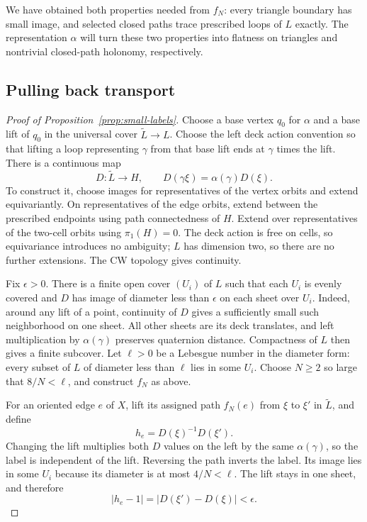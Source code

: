 We have obtained both properties needed from $f_N$: every triangle
boundary has small image, and selected closed paths trace prescribed
loops of $L$ exactly. The representation $\alpha$ will turn these two
properties into flatness on triangles and nontrivial closed-path
holonomy, respectively.

\subsection{Pulling back transport}

\begin{proof}[Proof of Proposition~\ref{prop:small-labels}]
Choose a base vertex $q_0$ for $\alpha$ and a base lift of $q_0$ in
the universal cover $\widetilde L\to L$.  Choose the left deck
action convention so that lifting a loop representing $\gamma$ from
that base lift ends at $\gamma$ times the lift.  There is a
continuous map
\begin{equation}\label{eq:developing-map}
 D:\widetilde L\longrightarrow H,
 \qquad D(\gamma\xi)=\alpha(\gamma)D(\xi).
\end{equation}
To construct it, choose images for representatives of the vertex
orbits and extend equivariantly.  On representatives of the edge
orbits, extend between the prescribed endpoints using path
connectedness of $H$.  Extend over representatives of the two-cell
orbits using $\pi_1(H)=0$.  The deck action is free on cells, so
equivariance introduces no ambiguity; $L$ has dimension two, so there
are no further extensions.  The CW topology gives continuity.

Fix $\epsilon>0$.  There is a finite open cover $(U_i)$ of $L$ such
that each $U_i$ is evenly covered and $D$ has image of diameter less
than $\epsilon$ on each sheet over $U_i$.  Indeed, around any lift
of a point, continuity of $D$ gives a sufficiently small such
neighborhood on one sheet.  All other sheets are its deck translates,
and left multiplication by $\alpha(\gamma)$ preserves quaternion
distance.  Compactness of $L$ then gives a finite subcover.  Let
$\ell>0$ be a Lebesgue number in the diameter form: every subset of
$L$ of diameter less than $\ell$ lies in some $U_i$.  Choose $N\geq2$
so large that $8/N<\ell$, and construct $f_N$ as above.

For an oriented edge $e$ of $X$, lift its assigned path $f_N(e)$ from
$\xi$ to $\xi'$ in $\widetilde L$, and define
\begin{equation}\label{eq:edge-transport}
 h_e=D(\xi)^{-1}D(\xi').
\end{equation}
Changing the lift multiplies both $D$ values on the left by the same
$\alpha(\gamma)$, so the label is independent of the lift.  Reversing
the path inverts the label.  Its image lies in some $U_i$ because its
diameter is at most $4/N<\ell$.  The lift stays in one sheet, and
therefore
\[
 |h_e-1|=|D(\xi')-D(\xi)|<\epsilon.
\]


\end{proof}
